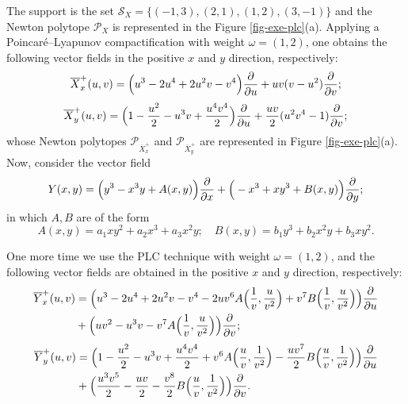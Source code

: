 \documentclass[12pt]{amsart}
\begin{document}
The support is the set $\mathcal{S}_{X} = \{(-1,3),(2,1),(1,2),(3,-1)\}$ and the Newton polytope $\mathcal{P}_{X}$ is represented in the Figure \ref{fig-exe-plc}(a). Applying a Poincaré--Lyapunov compactification with weight $\omega = (1,2)$, one obtains the following vector fields in the positive $x$ and $y$ direction, respectively:
\begin{equation*}
\overline{X}^{+}_{x}(u,v) = \Big{(}u^{3} - 2u^{4} + 2u^{2}v - v^{4}\Big{)}\displaystyle\frac{\partial}{\partial u} + uv(v - u^{2}) \displaystyle\frac{\partial}{\partial v}; 
\end{equation*}
\begin{equation*}
\overline{X}^{+}_{y}(u,v) = \Big{(}1 - \frac{u^{2}}{2} - u^{3}v + \frac{u^{4} v^{4}}{2}\Big{)}\displaystyle\frac{\partial}{\partial u} + \frac{uv}{2}(u^{2}v^{4} - 1) \displaystyle\frac{\partial}{\partial v};    
\end{equation*}
whose Newton polytopes $\mathcal{P}_{\overline{X}^{+}_{x}}$ and $\mathcal{P}_{\overline{X}^{+}_{y}}$ are represented in Figure \ref{fig-exe-plc}(a). Now, consider the vector field
\begin{equation*}
Y(x,y) = \Big{(}y^{3} - x^{3}y + A(x,y)\Big{)}\displaystyle\frac{\partial}{\partial x} + \Big{(}-x^{3} + xy^{3} + B(x,y)\Big{)}\displaystyle\frac{\partial}{\partial y};   
\end{equation*}
in which $A, B$ are of the form
$$A(x,y) = a_{1}xy^{2} + a_{2}x^{3} + a_{3}x^{2}y; \quad B(x,y) = b_{1}y^{3} + b_{2}x^{2}y + b_{3}xy^{2}.$$

One more time we use the PLC technique with weight $\omega = (1,2)$, and the following vector fields are obtained in the positive $x$ and $y$ direction, respectively:
\begin{equation*}
\begin{split}
\overline{Y}^{+}_{x}(u,v) & = \Big{(}u^{3} - 2u^{4} + 2u^{2}v - v^{4} - 2uv^{6}A\Big{(}\frac{1}{v}, \frac{u}{v^{2}}\Big{)} + v^{7}B\Big{(}\frac{1}{v}, \frac{u}{v^{2}}\Big{)}\Big{)}\displaystyle\frac{\partial}{\partial u}  \\
& + \Big{(}uv^{2} - u^{3}v  - v^{7}A\Big{(}\frac{1}{v}, \frac{u}{v^{2}}\Big{)}\Big{)} \displaystyle\frac{\partial}{\partial v}; 
\end{split}
\end{equation*}
\begin{equation*}
\begin{split}
\overline{Y}^{+}_{y}(u,v) & = \Big{(}1 - \frac{u^{2}}{2} - u^{3}v + \frac{u^{4} v^{4}}{2} + v^{6}A\Big{(}\frac{u}{v}, \frac{1}{v^{2}}\Big{)} - \frac{uv^{7}}{2}B\Big{(}\frac{u}{v}, \frac{1}{v^{2}}\Big{)}\Big{)}\displaystyle\frac{\partial}{\partial u}  \\
& + \Big{(}\frac{u^{3}v^{5}}{2} - \frac{uv}{2} - \frac{v^{8}}{2}B\Big{(}\frac{u}{v}, \frac{1}{v^{2}}\Big{)}\Big{)} \displaystyle\frac{\partial}{\partial v}. 
\end{split}
\end{equation*}
\end{document}

